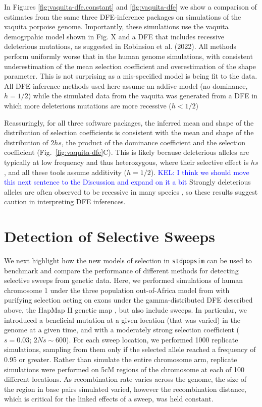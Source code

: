 \documentclass[hidelinks]{article}
\newcommand{\stdpopsim}{\texttt{stdpopsim}\xspace}
\newcommand{\kelcomment}[1]{\textcolor{blue}{KEL: #1}}
\begin{document}
    In Figures \ref{fig:vaquita-dfe.constant} and \ref{fig:vaquita-dfe} we show a comparison of estimates
    from the same three DFE-inference packages on simulations of the
    vaquita porpoise genome. Importantly, these simulations use the vaquita demogrpahic model shown in Fig. X and a DFE that includes recessive deleterious mutations, as suggested in Robinsion et al. (2022). All methods
    perform uniformly worse that in the human genome simulations, with consistent underestimation of the mean selection coefficient    
    and overestimation of the shape parameter. This is not surprising as a mis-specified model is being fit to the data. All DFE inference methods used here assume an addive model (no dominance, $h = 1/2$) while the simulated data from the vaquita  was generated from a DFE in which more deleterious mutations are more recessive ($h < 1/2$)
   
    Reassuringly, for all three software packages, the inferred mean and shape of the distribution of selection coefficients 
    is consistent with the mean and shape of the distribution of $2 h s$, the product of the dominance coefficient
    and the selection coefficient (Fig.~\ref{fig:vaquita-dfe}C).
    This is likely because deleterious alleles are typically at low frequency and thus heterozygous, 
    where their selective effect is $h s$, and all these tools assume additivity  ($h = 1/2$).
   \kelcomment{I think we should move this next sentence to the Discussion and expand on it a bit} Strongly deleterious alleles are often observed to be recessive in many species \citep{mukai1972mutation},
    so these results suggest caution in interpreting DFE inferences.

\section*{Detection of Selective Sweeps}
    \label{sweeps}
    We next highlight how the new models of selection in \stdpopsim can be used to benchmark and compare the performance of different methods for detecting selective sweeps from genetic data.
    Here, we performed simulations of human chromosome 1 under the three population out-of-Africa model from \cite{gutenkunst2009inferring} with purifying selection acting on exons under the gamma-distributed DFE described above, the HapMap II genetic map \citep{international2007second}, but also include sweeps.
    In particular, we introduced a beneficial mutation at a given location (that was varied) in the genome at a given time, and with a moderately strong selection coefficient ($s = 0.03$; $2Ns \sim 600$).
    For each sweep location, we performed 1000 replicate simulations, sampling from them only if the selected allele reached a frequency of 0.95 or greater.
    Rather than simulate the entire chromosome arm, replicate simulations were performed on 5cM regions of the chromosome at each of 100 different locations.
    As recombination rate varies across the genome, the size of the region in base pairs simulated varied, however the recombination distance, which is critical for the linked effects of a sweep, was held constant.
 
\end{document}
